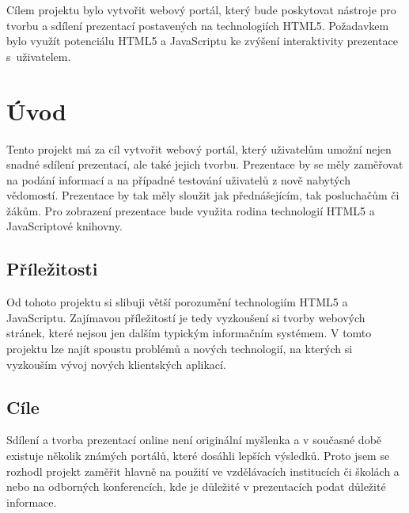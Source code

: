 \documentclass[11pt,twoside,a4paper]{book}
\begin{document}
	\baselineskip

	\noindent
	Cílem projektu bylo vytvořit webový portál, který bude poskytovat nástroje pro tvorbu a sdílení prezentací postavených na technologiích HTML5. Požadavkem bylo využít potenciálu HTML5 a JavaScriptu ke zvýšení interaktivity prezentace s~uživatelem.

	\tableofcontents		%

	\listoffigures			%

	\mainbodystarts



\chapter{Úvod}
Tento projekt má za cíl vytvořit webový portál, který uživatelům umožní nejen snadné sdílení prezentací, ale také jejich tvorbu. Prezentace by se měly zaměřovat na podání informací a na případné testování uživatelů z nově nabytých vědomostí. Prezentace by tak měly sloužit jak přednášejícím, tak posluchačům či žákům. Pro zobrazení prezentace bude využita rodina technologií HTML5 a JavaScriptové knihovny.

\section{Příležitosti}
Od tohoto projektu si slibuji větší porozumění technologiím HTML5 a JavaScriptu. Zajímavou příležitostí je tedy vyzkoušení si tvorby webových stránek, které nejsou jen dalším typickým informačním systémem. V tomto projektu lze najít spoustu problémů a nových technologií, na kterých si vyzkouším vývoj nových klientských aplikací.

\section{Cíle}
Sdílení a tvorba prezentací online není originální myšlenka a v současné době existuje několik známých portálů, které dosáhli lepších výsledků. Proto jsem se rozhodl projekt zaměřit hlavně na použití ve vzdělávacích institucích či školách a nebo na odborných konferencích, kde je důležité v prezentacích podat důležité informace.
\end{document}
